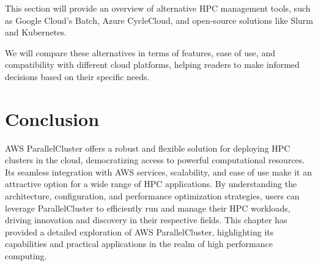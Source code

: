 This section will provide an overview of alternative HPC management tools, such as Google Cloud's Batch, Azure CycleCloud, and open-source solutions like Slurm and Kubernetes. 

We will compare these alternatives in terms of features, ease of use, and compatibility with different cloud platforms, helping readers to make informed decisions based on their specific needs.

\section{Conclusion}

AWS ParallelCluster offers a robust and flexible solution for deploying HPC clusters in the cloud, democratizing access to powerful computational resources. Its seamless integration with AWS services, scalability, and ease of use make it an attractive option for a wide range of HPC applications. By understanding the architecture, configuration, and performance optimization strategies, users can leverage ParallelCluster to efficiently run and manage their HPC workloads, driving innovation and discovery in their respective fields. This chapter has provided a detailed exploration of AWS ParallelCluster, highlighting its capabilities and practical applications in the realm of high performance computing.

